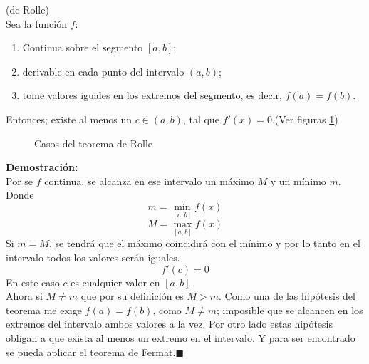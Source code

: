 \documentclass[10pt,twoside]{SelfArx} %
\begin{document}
\begin{teorema}
	(de Rolle)\\
	Sea la función $ f $:
	\begin{enumerate}
		\item Continua sobre el segmento $ [a,b] $;
		\item derivable en cada punto del intervalo $ (a,b) $;
		\item tome valores iguales en los extremos del segmento, es decir, $ f(a)=f(b) $.
	\end{enumerate}
	Entonces; existe al menos un $ c\in(a,b) $, tal que $ f'(x)=0 $.(Ver figuras \ref{rolle})
\end{teorema}
\begin{figure}[h]
\centering
{}
\caption{Casos del teorema de Rolle}
\label{rolle}
\end{figure}
 \textbf{Demostración:}\\
 Por se $ f $ continua, se alcanza en ese intervalo un máximo $ M $ y un mínimo $ m $. Donde 
 \[ m=\min_{[a,b]}f(x) \]
 \[ M=\max_{[a,b]}f(x) \]
 Si $ m=M $, se tendr\'a que el máximo coincidirá con el mínimo y por lo tanto en el intervalo todos los valores serán iguales.
 \begin{equation}
 f'(c)=0
 \end{equation}
 En este caso $ c $ es cualquier valor en $ [a,b] $.\\
 Ahora si $ M\neq m $ que por su definici\'on es $ M>m $. Como una de las hipótesis del teorema me exige $ f(a)=f(b) $, como $ M\neq m $; imposible que se alcancen en los extremos del intervalo ambos valores a la vez. Por otro lado estas hipótesis obligan a que exista al menos un extremo en el intervalo. Y para ser encontrado se pueda aplicar el teorema de Fermat.$ \blacksquare $
 
\end{document}
